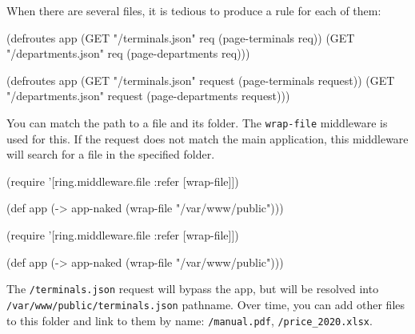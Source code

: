 When there are several files, it is tedious to produce a rule for each of them:

\ifx\DEVICETYPE\MOBILE

\begin{english}
  \begin{clojure}
(defroutes app
  (GET "/terminals.json"
       req (page-terminals req))
  (GET "/departments.json"
       req (page-departments req)))
  \end{clojure}
\end{english}

\else

\begin{english}
  \begin{clojure}
(defroutes app
  (GET "/terminals.json"   request (page-terminals request))
  (GET "/departments.json" request (page-departments request)))
  \end{clojure}
\end{english}

\fi


You can match the path to a file and its folder. The \verb|wrap-file| middleware is used for this. If the request does not match the main application, this middleware will search for a file in the specified folder.

\ifx\DEVICETYPE\MOBILE

\begin{english}
  \begin{clojure}
(require '[ring.middleware.file
           :refer [wrap-file]])

(def app
  (-> app-naked
      (wrap-file "/var/www/public")))
  \end{clojure}
\end{english}

\else

\begin{english}
  \begin{clojure}
(require '[ring.middleware.file :refer [wrap-file]])

(def app (-> app-naked
             (wrap-file "/var/www/public")))
  \end{clojure}
\end{english}

\fi

The \verb|/terminals.json| request will bypass the app, but will be resolved into \verb|/var/www/public/terminals.json| pathname. Over time, you can add other files to this folder and link to them by name: \verb|/manual.pdf|, \verb|/price_2020.xlsx|.

